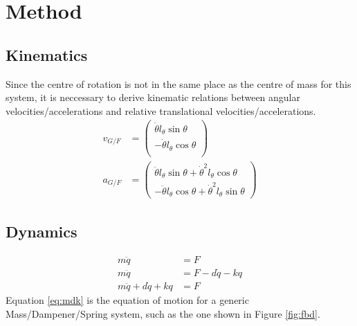 \documentclass[11pt]{article}
\begin{document}
\section*{Method}\label{sec:method}

\subsection*{Kinematics}\label{sec:kin}
Since the centre of rotation is not in the same place as the centre of mass for this system, it is neccessary to derive kinematic relations between angular velocities/accelerations and relative translational velocities/accelerations.
\begin{align}
  v_{G/F} &=
  \begin{pmatrix}
     \dot{\theta}l_{\theta}\sin\theta \\
    -\dot{\theta}l_{\theta}\cos\theta \\
  \end{pmatrix} \label{eq:kin1} \\
  a_{G/F} &=
  \begin{pmatrix}
     \ddot{\theta}l_{\theta}\sin\theta + \dot{\theta}^2l_{\theta}\cos\theta \\
    -\ddot{\theta}l_{\theta}\cos\theta + \dot{\theta}^2l_{\theta}\sin\theta 
  \end{pmatrix} \label{eq:kin2}
\end{align}

\subsection*{Dynamics}\label{sec:dyn}
\begin{align}
  m\ddot{q} &= F \nonumber \\
  m\ddot{q} &= F - d\dot{q} - kq \nonumber \\
  m\ddot{q} + d\dot{q} + kq &= F \label{eq:mdk}
\end{align}
Equation \ref{eq:mdk} is the equation of motion for a generic Mass/Dampener/Spring system, such as the one shown in Figure \ref{fig:fbd}.
\end{document}
